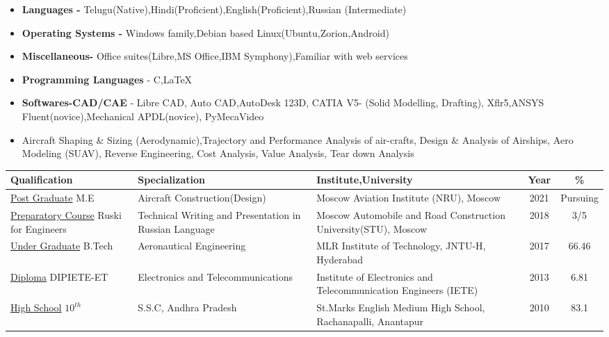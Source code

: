 \documentclass[a4paper]{article}
\begin{document}
\begin{itemize}
		\item \noindent\textbf{Languages - }Telugu(Native),Hindi(Proficient),English(Proficient),Russian (Intermediate)
		\item \noindent\textbf{Operating Systems -} Windows family,Debian based Linux(Ubuntu,Zorion,Android)
		\item \noindent\textbf{Miscellaneous-} Office suites(Libre,MS Office,IBM Symphony),Familiar with web services 
		\item \noindent \textbf{Programming Languages} - C,\LaTeX
		\item \noindent \textbf{Softwares-CAD/CAE} - Libre CAD, Auto CAD,AutoDesk 123D, CATIA V5- (Solid Modelling, Drafting), Xflr5,ANSYS Fluent(novice),Mechanical APDL(novice), PyMecaVideo %
		\item \noindent Aircraft Shaping \& Sizing (Aerodynamic),Trajectory and Performance Analysis of air-crafts, Design \& Analysis of Airships, Aero Modeling (SUAV), Reverse Engineering, Cost Analysis, Value Analysis, Tear down Analysis
\end{itemize}
\colorbox{mygrey}{\hspace{\linewidth}\hspace{-2\fboxsep}}
		\begin{center}
		    \begin{tabular}{p{3.5 cm} @{\hskip 0.15in} p{3.6 cm} @{\hskip 0.15in} p{6 cm} @{\hskip 0.15in} c @{\hskip 0.15in} c @{\hskip 0.15in}}
			\hline
				\textbf{Qualification} & \textbf{Specialization} & \textbf{Institute,University} & \textbf{Year} & \textbf{\%} \\
				\hline
					\underline{Post Graduate} \newline
				M.E & Aircraft \newline Construction(Design)& Moscow Aviation Institute (NRU), Moscow & 2021 & Pursuing\\
				\underline{Preparatory Course} Ruski for Engineers& Technical Writing and Presentation in Russian Language& Moscow Automobile and Road \newline Construction University(STU), Moscow & 2018 & 3/5\\
				\underline{Under Graduate}  
				B.Tech& Aeronautical Engineering & MLR Institute of Technology, JNTU-H, Hyderabad & 2017 & 66.46\\
				\underline{Diploma}\newline
				DIPIETE-ET& Electronics and Telecommunications &Institute of Electronics and Telecommunication Engineers (IETE)& 2013 & 6.81\\
				\underline{High School}\newline
				$10^{th}$& S.S.C, Andhra Pradesh & St.Marks English Medium High School, Rachanapalli, Anantapur & 2010 & 83.1\\
				\hline
			\end{tabular}
	\end{center}
\end{document}
